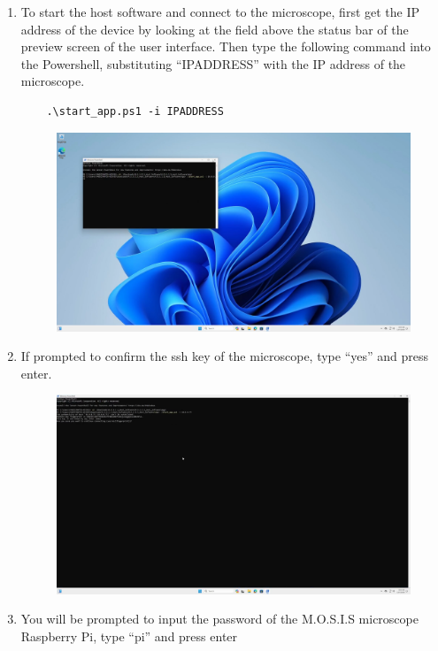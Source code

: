 \documentclass[12pt]{article}
\begin{document}
\begin{center}
\begin{enumerate}
\begin{figure}[H]
		      \end{figure}
		\item To start the host software and connect to the microscope, first get the IP address of the device by looking at the field above the status bar of the preview screen of the user interface. Then type the following command into the Powershell, substituting ``IPADDRESS'' with the IP address of the microscope.
		      \begin{verbatim}
    .\start_app.ps1 -i IPADDRESS
  \end{verbatim}
		      \begin{figure}[H]
			      \includegraphics[width=\textwidth]{Figures/Windows-Start-Host-Software-With-IP.png}
		      \end{figure}
		\item If prompted to confirm the ssh key of the microscope, type ``yes'' and press enter.
		      \begin{figure}[H]
			      \includegraphics[width=\textwidth]{Figures/Windows-ssh-authenticity-prompt.png}
		      \end{figure}
		\item You will be prompted to input the password of the M.O.S.I.S microscope Raspberry Pi, type ``pi'' and press enter

\end{enumerate}
\end{center}
\end{document}
